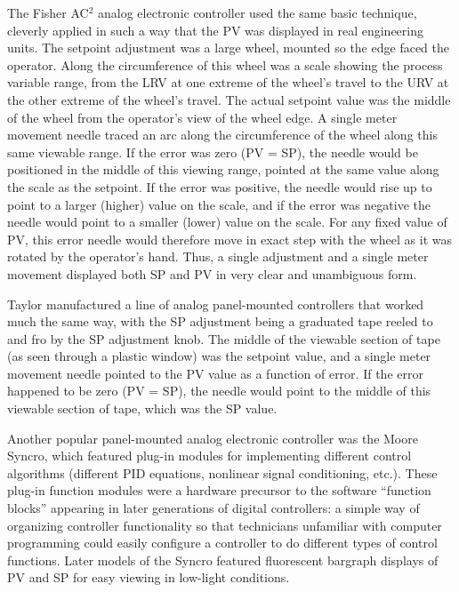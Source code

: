 The Fisher AC$^{2}$ analog electronic controller used the same basic technique, cleverly applied in such a way that the PV was displayed in real engineering units.  The setpoint adjustment was a large wheel, mounted so the edge faced the operator.  Along the circumference of this wheel was a scale showing the process variable range, from the LRV at one extreme of the wheel's travel to the URV at the other extreme of the wheel's travel.  The actual setpoint value was the middle of the wheel from the operator's view of the wheel edge.  A single meter movement needle traced an arc along the circumference of the wheel along this same viewable range.  If the error was zero (PV = SP), the needle would be positioned in the middle of this viewing range, pointed at the same value along the scale as the setpoint.  If the error was positive, the needle would rise up to point to a larger (higher) value on the scale, and if the error was negative the needle would point to a smaller (lower) value on the scale.  For any fixed value of PV, this error needle would therefore move in exact step with the wheel as it was rotated by the operator's hand.  Thus, a single adjustment and a single meter movement displayed both SP and PV in very clear and unambiguous form.

Taylor manufactured a line of analog panel-mounted controllers that worked much the same way, with the SP adjustment being a graduated tape reeled to and fro by the SP adjustment knob.  The middle of the viewable section of tape (as seen through a plastic window) was the setpoint value, and a single meter movement needle pointed to the PV value as a function of error.  If the error happened to be zero (PV = SP), the needle would point to the middle of this viewable section of tape, which was the SP value.  

Another popular panel-mounted analog electronic controller was the Moore Syncro, which featured plug-in modules for implementing different control algorithms (different PID equations, nonlinear signal conditioning, etc.).  These plug-in function modules were a hardware precursor to the software ``function blocks'' appearing in later generations of digital controllers: a simple way of organizing controller functionality so that technicians unfamiliar with computer programming could easily configure a controller to do different types of control functions.  Later models of the Syncro featured fluorescent bargraph displays of PV and SP for easy viewing in low-light conditions.  

